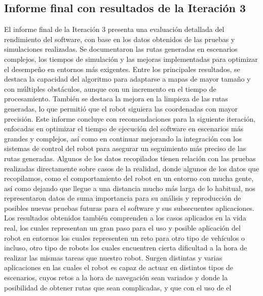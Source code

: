 \subsection{Informe final con resultados de la Iteraci\'on 3}
    El informe final de la Iteraci\'on 3 presenta una evaluaci\'on
        detallada del rendimiento del software, con base en los datos
        obtenidos de las pruebas y simulaciones realizadas. Se
        documentaron las rutas generadas en escenarios complejos,
        los tiempos de simulaci\'on y las mejoras implementadas para
        optimizar el desempe\~no en entornos m\'as exigentes.
    \vskip 0.5cm
    Entre los principales resultados, se destaca la capacidad del
        algoritmo para adaptarse a mapas de mayor tama\~no y con
        m\'ultiples obst\'aculos, aunque con un incremento en el tiempo
        de procesamiento. Tambi\'en se destaca la mejora en la
        limpieza de las rutas generadas, lo que permiti\'o que el robot
        siguiera las coordenadas con mayor precisi\'on.
    \vskip 0.5cm
    Este informe concluye con recomendaciones para la
        siguiente iteraci\'on, enfocadas en optimizar el tiempo de
        ejecuci\'on del software en escenarios m\'as grandes y
        complejos, as\'i como en continuar mejorando la integraci\'on
        con los sistemas de control del robot para asegurar un
        seguimiento m\'as preciso de las rutas generadas.
    \vskip 0.5cm
    Algunos de los datos recopilados tienen relaci\'on con las pruebas realizadas
        directamente sobre casos de la realidad, donde algunos de los datos que recopilamos,
        como el comportamiento del robot en un entorno con mucha gente, as\'i como dejando
        que llegue a una distancia mucho m\'as larga de lo habitual, nos representaron datos de
        suma importancia para su an\'alisis y reproducci\'on de posibles nuevas pruebas futuras
        para el software y sus subsecuentes aplicaciones.
    \vskip 0.5cm
    Los resultados obtenidos tambi\'en comprenden a los casos aplicados en la vida real,
        los cuales representan un gran paso para el uso y posible aplicaci\'on del robot en
        entornos los cuales representen un reto para otro tipo de veh\'iculos o incluso, otro tipo
        de robots los cuales encuentren cierta dificultad a la hora de realizar las mismas tareas
        que nuestro robot.
    \vskip 0.5cm
    Surgen distintas y varias aplicaciones en las cuales el robot es capaz de actuar en
        distintos tipos de escenarios, cuyos retos a la hora de navegaci\'on sean variados y
        donde la posibilidad de obtener rutas que sean complicadas, y que con el uso de el

